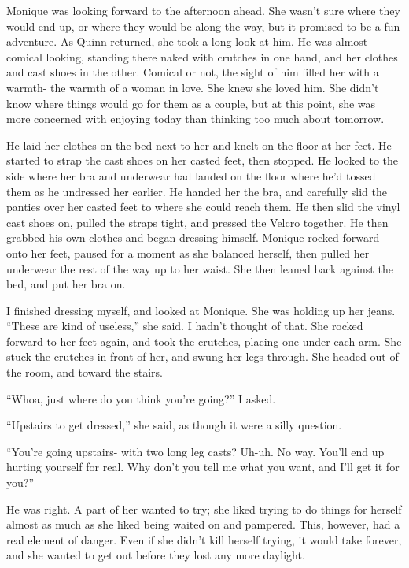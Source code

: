 \begin{thought}
Monique was looking forward to the afternoon ahead. She wasn't sure where they would end
up, or where they would be along the way, but it promised to be a fun adventure. As Quinn
returned, she took a long look at him. He was almost comical looking, standing there naked with
crutches in one hand, and her clothes and cast shoes in the other. Comical or not, the sight of
him filled her with a warmth- the warmth of a woman in love. She knew she loved him. She didn't
know where things would go for them as a couple, but at this point, she was more concerned with
enjoying today than thinking too much about tomorrow.

He laid her clothes on the bed next to her and knelt on the floor at her feet. He started
to strap the cast shoes on her casted feet, then stopped. He looked to the side where her bra
and underwear had landed on the floor where he'd tossed them as he undressed her earlier. He
handed her the bra, and carefully slid the panties over her casted feet to where she could reach
them. He then slid the vinyl cast shoes on, pulled the straps tight, and pressed the Velcro
together. He then grabbed his own clothes and began dressing himself. Monique rocked forward
onto her feet, paused for a moment as she balanced herself, then pulled her underwear the rest
of the way up to her waist. She then leaned back against the bed, and put her bra on.
\end{thought}

I finished dressing myself, and looked at Monique. She was holding up her jeans. ``These are
kind of useless,'' she said. I hadn't thought of that. She rocked forward to her feet again, and
took the crutches, placing one under each arm. She stuck the crutches in front of her, and swung
her legs through. She headed out of the room, and toward the stairs.

``Whoa, just where do you think you're going?'' I asked.

``Upstairs to get dressed,'' she said, as though it were a silly question.

``You're going upstairs- with two long leg casts? Uh-uh. No way. You'll end up hurting
yourself for real. Why don't you tell me what you want, and I'll get it for you?''

\begin{thought}
He was right. A part of her wanted to try; she liked trying to do things for herself almost
as much as she liked being waited on and pampered. This, however, had a real element of danger.
Even if she didn't kill herself trying, it would take forever, and she wanted to get out before
they lost any more daylight.
\end{thought}

